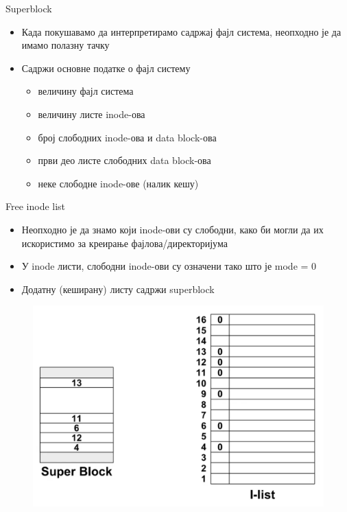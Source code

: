 \documentclass[xcolor=table]{beamer}
\begin{document}
    \begin{frame}{Superblock}
        \begin{itemize}
            \item Када покушавамо да интерпретирамо садржај фајл система, неопходно је да имамо полазну тачку
            \item Садржи основне податке о фајл систему
            \begin{itemize}
                \item величину фајл система
                \item величину листе inode-ова
                \item број слободних inode-ова и data block-ова
                \item први део листе слободних data block-ова
                \item неке слободне inode-ове (налик кешу)
            \end{itemize}
        \end{itemize}
    \end{frame}
    
    \begin{frame}[allowframebreaks]{Free inode list}
        \begin{itemize}
            \item Неопходно је да знамо који inode-ови су слободни, како би могли да их искористимо за креирање фајлова/директоријума
            \item У inode листи, слободни inode-ови су означени тако што је mode = 0
            \item Додатну (кеширану) листу садржи superblock
        \end{itemize}
        
        \framebreak
        
        \begin{figure}
            \centering
            \includegraphics[width=\textwidth,height=0.8\textheight,keepaspectratio]{images/free_inode_list.png}
            \label{fig:free_inode_list.png}
        \end{figure}
    \end{frame}
    
\end{document}
